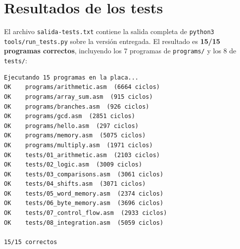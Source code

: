 \documentclass[11pt,a4paper]{article}
\begin{document}
\section{Resultados de los tests}

El archivo \texttt{salida-tests.txt} contiene la salida completa de \texttt{python3 tools/run\_tests.py} sobre la versión entregada. El resultado es \textbf{15/15 programas correctos}, incluyendo los 7 programas de \texttt{programs/} y los 8 de \texttt{tests/}:

\begin{Verbatim}[fontsize=\small]
Ejecutando 15 programas en la placa...
OK    programs/arithmetic.asm  (6664 ciclos)
OK    programs/array_sum.asm  (915 ciclos)
OK    programs/branches.asm  (926 ciclos)
OK    programs/gcd.asm  (2851 ciclos)
OK    programs/hello.asm  (297 ciclos)
OK    programs/memory.asm  (5075 ciclos)
OK    programs/multiply.asm  (1971 ciclos)
OK    tests/01_arithmetic.asm  (2103 ciclos)
OK    tests/02_logic.asm  (3009 ciclos)
OK    tests/03_comparisons.asm  (3061 ciclos)
OK    tests/04_shifts.asm  (3071 ciclos)
OK    tests/05_word_memory.asm  (2374 ciclos)
OK    tests/06_byte_memory.asm  (3696 ciclos)
OK    tests/07_control_flow.asm  (2933 ciclos)
OK    tests/08_integration.asm  (5059 ciclos)

15/15 correctos
\end{Verbatim}
\end{document}
